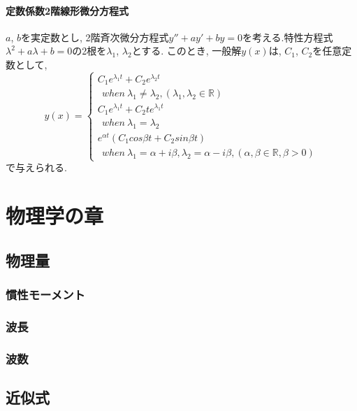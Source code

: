 \documentclass[a4paper]{report}
\begin{document}
\subsection{定数係数2階線形微分方程式}
$a$, $b$を実定数とし, 2階斉次微分方程式$y''+ay'+by=0$を考える.特性方程式$\lambda^2+a\lambda+b=0$の2根を$\lambda_{1}$, $\lambda_{2}$とする. このとき, 一般解$y(x)$は, $C_{1}$, $C_{2}$を任意定数として, 
\begin{equation}
    y(x)= \left \{
        \begin{array}{l}
            C_{1}e^{\lambda_{1} t}+C_{2}e^{\lambda_{2} t}\\
            \ \ when \ \lambda_{1}\neq\lambda_{2}, (\lambda_{1}, \lambda_{2}\in\mathbb{R}) \\
            C_{1}e^{\lambda_{1} t}+C_{2}te^{\lambda_{1} t}\\
            \ \ when \ \lambda_{1}=\lambda_{2} \\
            e^{\alpha t}(C_{1}cos{\beta t}+C_{2}sin{\beta t}) \\
            \ \ when \ \lambda_{1}=\alpha+{i\beta}, \lambda_{2}=\alpha-{i\beta}, (\alpha, \beta\in\mathbb{R}, \beta>0)
        \end{array}
    \right.
\end{equation}
で与えられる.

\part{物理学の章}
\chapter{物理量}
\section{慣性モーメント}
\section{波長}

\section{波数}

\chapter{近似式}
\end{document}
